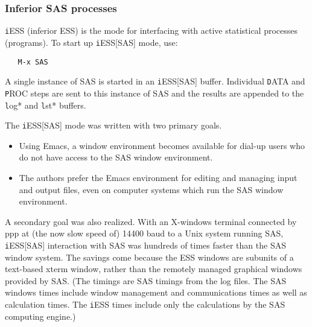\documentclass{article}
\begin{document}
% 
% 

\subsubsection{Inferior SAS processes}
\label{sec:SAS:proc:inf}

{\texttt iESS} (inferior ESS) is the mode for interfacing with active
statistical processes (programs).  To start up {\texttt iESS[SAS]} mode, use:
\begin{verbatim}
   M-x SAS
\end{verbatim}   
A single instance of SAS is started in an {\texttt iESS[SAS]} buffer.  Individual
{\texttt DATA} and {\texttt PROC} steps are sent to this instance of SAS and the results
are appended to the {\texttt *log*} and {\texttt *lst*} buffers.

The {\texttt iESS[SAS]} mode was written with two primary goals.
\begin{itemize}
\item Using Emacs, a window environment becomes available for dial-up
  users who do not have access to the SAS window environment.
\item The authors prefer the Emacs environment for editing and
  managing input and output files, even on computer systems which run
  the SAS window environment.
\end{itemize}
A secondary goal was also realized.  With an X-windows
terminal connected by ppp at (the now slow speed of)
14400 baud to a Unix system running SAS,
{\texttt iESS[SAS]} interaction with SAS was hundreds of times faster than the
SAS window system.  The savings come because the ESS windows are
subunits of a text-based xterm window, rather than the remotely
managed graphical windows provided by SAS.  (The timings are SAS
timings from the log files.  The SAS windows times include window
management and communications times as well as calculation times.  The
{\texttt iESS} times include only the calculations by the SAS computing engine.)
\end{document}
